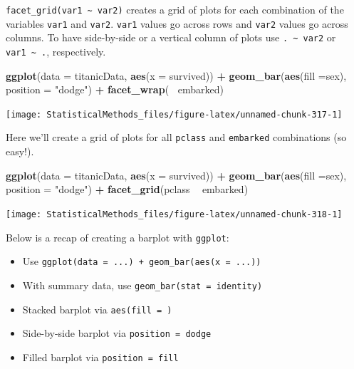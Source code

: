 \documentclass[
]{book}
\newenvironment{Shaded}{\begin{snugshade}}{\end{snugshade}}
\newcommand{\DataTypeTok}[1]{\textcolor[rgb]{0.13,0.29,0.53}{#1}}
\newcommand{\KeywordTok}[1]{\textcolor[rgb]{0.13,0.29,0.53}{\textbf{#1}}}
\newcommand{\NormalTok}[1]{#1}
\newcommand{\OperatorTok}[1]{\textcolor[rgb]{0.81,0.36,0.00}{\textbf{#1}}}
\newcommand{\StringTok}[1]{\textcolor[rgb]{0.31,0.60,0.02}{#1}}
\theoremstyle{definition}
\theoremstyle{definition}
\theoremstyle{definition}
\theoremstyle{remark}
\begin{document}
\texttt{facet\_grid(var1\ \textasciitilde{}\ var2)} creates a grid of plots for each combination of the variables \texttt{var1} and \texttt{var2}. \texttt{var1} values go across rows and \texttt{var2} values go across columns. To have side-by-side or a vertical column of plots use \texttt{.\ \textasciitilde{}\ var2} or \texttt{var1\ \textasciitilde{}\ .}, respectively.

\begin{Shaded}
\begin{Highlighting}[]
\KeywordTok{ggplot}\NormalTok{(}\DataTypeTok{data =}\NormalTok{ titanicData, }\KeywordTok{aes}\NormalTok{(}\DataTypeTok{x =}\NormalTok{ survived)) }\OperatorTok{+}\StringTok{ }
\StringTok{  }\KeywordTok{geom_bar}\NormalTok{(}\KeywordTok{aes}\NormalTok{(}\DataTypeTok{fill =}\NormalTok{sex), }\DataTypeTok{position =} \StringTok{"dodge"}\NormalTok{) }\OperatorTok{+}
\StringTok{  }\KeywordTok{facet_wrap}\NormalTok{(}\OperatorTok{~}\StringTok{ }\NormalTok{embarked)}
\end{Highlighting}
\end{Shaded}

\begin{center}\texttt{[image: StatisticalMethods\_files/figure-latex/unnamed-chunk-317-1]} \end{center}

Here we'll create a grid of plots for all \texttt{pclass} and \texttt{embarked} combinations (so easy!).

\begin{Shaded}
\begin{Highlighting}[]
\KeywordTok{ggplot}\NormalTok{(}\DataTypeTok{data =}\NormalTok{ titanicData, }\KeywordTok{aes}\NormalTok{(}\DataTypeTok{x =}\NormalTok{ survived)) }\OperatorTok{+}\StringTok{ }
\StringTok{  }\KeywordTok{geom_bar}\NormalTok{(}\KeywordTok{aes}\NormalTok{(}\DataTypeTok{fill =}\NormalTok{sex), }\DataTypeTok{position =} \StringTok{"dodge"}\NormalTok{) }\OperatorTok{+}
\StringTok{  }\KeywordTok{facet_grid}\NormalTok{(pclass }\OperatorTok{~}\StringTok{ }\NormalTok{embarked)}
\end{Highlighting}
\end{Shaded}

\begin{center}\texttt{[image: StatisticalMethods\_files/figure-latex/unnamed-chunk-318-1]} \end{center}

Below is a recap of creating a barplot with \texttt{ggplot}:

\begin{itemize}
\item
  Use \texttt{ggplot(data\ =\ ...)\ +\ geom\_bar(aes(x\ =\ ...))}
\item
  With summary data, use \texttt{geom\_bar(stat\ =\ identity)}
\item
  Stacked barplot via \texttt{aes(fill\ =\ )}
\item
  Side-by-side barplot via \texttt{position\ =\ dodge}
\item
  Filled barplot via \texttt{position\ =\ fill}
\end{itemize}
\end{document}
